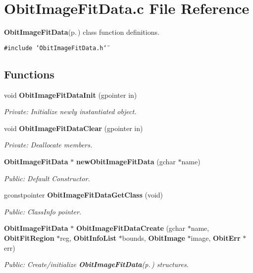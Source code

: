 \section{Obit\-Image\-Fit\-Data.c File Reference}
\label{ObitImageFitData_8c}
{\bf Obit\-Image\-Fit\-Data}{\rm (p.\,\pageref{structObitImageFitData})} class function definitions. 

{\tt \#include \char`\"{}Obit\-Image\-Fit\-Data.h\char`\"{}}\par
\subsection*{Functions}
\begin{CompactItemize}
\item 
void {\bf Obit\-Image\-Fit\-Data\-Init} (gpointer in)
\begin{CompactList}\small\item\em Private: Initialize newly instantiated object. \item\end{CompactList}\item 
void {\bf Obit\-Image\-Fit\-Data\-Clear} (gpointer in)
\begin{CompactList}\small\item\em Private: Deallocate members. \item\end{CompactList}\item 
{\bf Obit\-Image\-Fit\-Data} $\ast$ {\bf new\-Obit\-Image\-Fit\-Data} (gchar $\ast$name)
\begin{CompactList}\small\item\em Public: Default Constructor. \item\end{CompactList}\item 
gconstpointer {\bf Obit\-Image\-Fit\-Data\-Get\-Class} (void)
\begin{CompactList}\small\item\em Public: Class\-Info pointer. \item\end{CompactList}\item 
{\bf Obit\-Image\-Fit\-Data} $\ast$ {\bf Obit\-Image\-Fit\-Data\-Create} (gchar $\ast$name, {\bf Obit\-Fit\-Region} $\ast$reg, {\bf Obit\-Info\-List} $\ast$bounds, {\bf Obit\-Image} $\ast$image, {\bf Obit\-Err} $\ast$err)
\begin{CompactList}\small\item\em Public: Create/initialize {\bf Obit\-Image\-Fit\-Data}{\rm (p.\,\pageref{structObitImageFitData})} structures. \item\end{CompactList}\item 

\end{CompactItemize}
